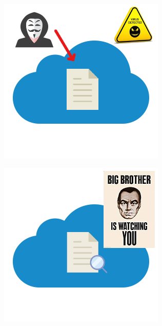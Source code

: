 \documentclass[french]{article}
\begin{document}
\begin{center}
  \begin{minipage}[t]{.49\linewidth}
    \centering
    \includegraphics[scale=.4]{images/threat1.png}
    \label{fig:threat1}
  \end{minipage}
  \hfill
  \begin{minipage}[t]{.49\linewidth}
    \centering
    \includegraphics[scale=.4]{images/threat2.png}
    \label{fig:threat2}
  \end{minipage}
\end{center}
\end{document}
